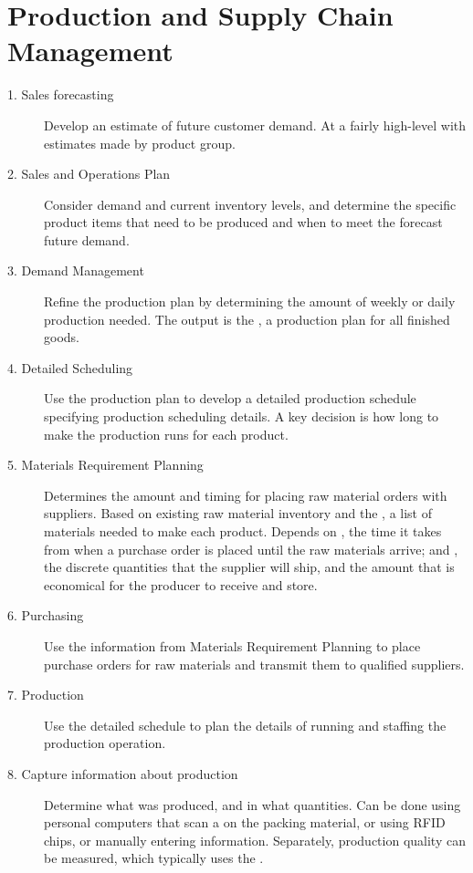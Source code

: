 \documentclass[\main/notes.tex]{subfiles}
\begin{document}
		\section{Production and Supply Chain Management}
			\begin{description}
				\item[1. Sales forecasting] Develop an estimate of future customer demand. At a fairly high-level with estimates made by product group.
				\item[2. Sales and Operations Plan] Consider demand and current inventory levels, and determine the specific product items that need to be produced and when to meet the forecast future demand.
				\item[3. Demand Management] Refine the production plan by determining the amount of weekly or daily production needed. The output is the , a production plan for all finished goods.
				\item[4. Detailed Scheduling] Use the production plan to develop a detailed production schedule specifying production scheduling details. A key decision is how long to make the production runs for each product.
				\item[5. Materials Requirement Planning] Determines the amount and timing for placing raw material orders with suppliers. Based on existing raw material inventory and the , a list of materials needed to make each product. Depends on , the time it takes from when a purchase order is placed until the raw materials arrive; and , the discrete quantities that the supplier will ship, and the amount that is economical for the producer to receive and store.
				\item[6. Purchasing] Use the information from Materials Requirement Planning to place purchase orders for raw materials and transmit them to qualified suppliers.
				\item[7. Production] Use the detailed schedule to plan the details of running and staffing the production operation.
				\item[8. Capture information about production] Determine what was produced, and in what quantities. Can be done using personal computers that scan a  on the packing material, or using RFID chips, or manually entering information. Separately, production quality can be measured, which typically uses the .
			\end{description}
\end{document}
